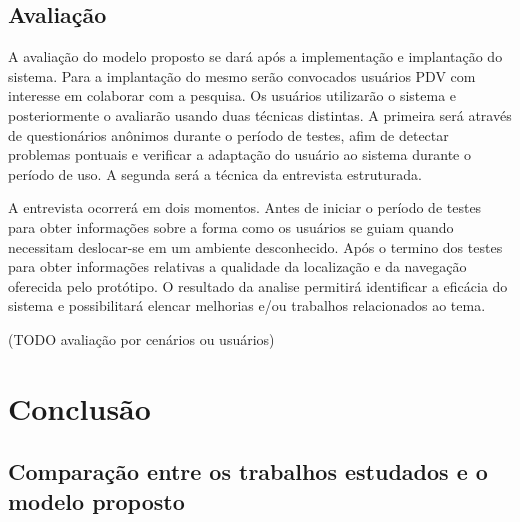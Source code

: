 \documentclass[english,brazilian]{UNISINOSmonografia}
\begin{document}
	\section{Avaliação}
A avaliação do modelo proposto se dará após a implementação e implantação do sistema. Para a implantação do mesmo serão convocados usuários PDV com interesse em colaborar com a pesquisa. Os usuários utilizarão o sistema e posteriormente o avaliarão usando duas técnicas distintas. A primeira será através de questionários anônimos durante o período de testes, afim de detectar problemas pontuais e verificar a adaptação do usuário ao sistema durante o período de uso. A segunda será a técnica da entrevista estruturada. 

A entrevista ocorrerá em dois momentos. Antes de iniciar o período de testes para obter informações sobre a forma como os usuários se guiam quando necessitam deslocar-se em um ambiente desconhecido. Após o termino dos testes para obter informações relativas a qualidade da localização e da navegação oferecida pelo protótipo. O resultado da analise permitirá identificar a eficácia do sistema e possibilitará elencar melhorias e/ou trabalhos relacionados ao tema.

(TODO avaliação por cenários ou usuários)

\chapter{Conclusão}

\section{Comparação entre os trabalhos estudados e o modelo proposto}
\end{document}

